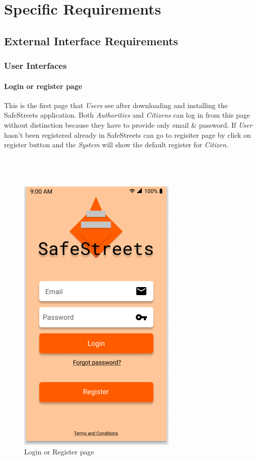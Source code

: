 \documentclass{article}
\begin{document}
\clearpage
\section{Specific Requirements}

\subsection{External Interface Requirements}
\subsubsection{User Interfaces}

\paragraph{Login or register page}
This is the first page that \textit{Users} see after downloading and installing the SafeStreets 
application. Both \textit{Authorities} and \textit{Citizens} can log in from this page without 
distinction because they have to provide only email \& password. If \textit{User} hasn't been registered
already in SafeStreets can go to regisiter page by click on register button and the \textit{System} will
show the default register for \textit{Citizen}.
\\
\\
\\
\\
\begin{figure}[H]
    \centering
    \includegraphics[scale=0.5]{img/mockups/login.png}
    \caption{Login or Register page}
\end{figure}
\end{document}
